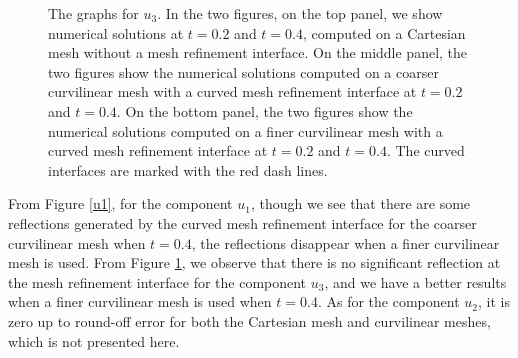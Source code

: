 \begin{figure}[htbp]
	\caption{The graphs for $u_3$. In the two figures, on the top panel, we show numerical solutions at $t=0.2$ and $t=0.4$, computed on a Cartesian mesh without a mesh refinement interface. On the middle panel, the two figures show the numerical solutions computed on a coarser curvilinear mesh with a curved mesh refinement interface at $t=0.2$ and $t=0.4$. On the bottom panel, the two figures show the numerical solutions computed on a finer curvilinear mesh with a curved mesh refinement interface at $t=0.2$ and $t=0.4$. The curved interfaces are marked with the red dash lines.}
\label{u3}
\end{figure}
From Figure \ref{u1}, for the component $u_1$, though we see that there are some reflections generated by the curved mesh refinement interface for the coarser curvilinear mesh when $t = 0.4$, the reflections disappear when a finer curvilinear mesh is used. From Figure \ref{u3}, we observe that there is no significant reflection at the mesh refinement interface for the component $u_3$, and we have a better results when a finer curvilinear mesh is used when $t = 0.4$. As for the component $u_2$, it is zero up to round-off error for both the Cartesian mesh and curvilinear meshes, which is not presented here.
